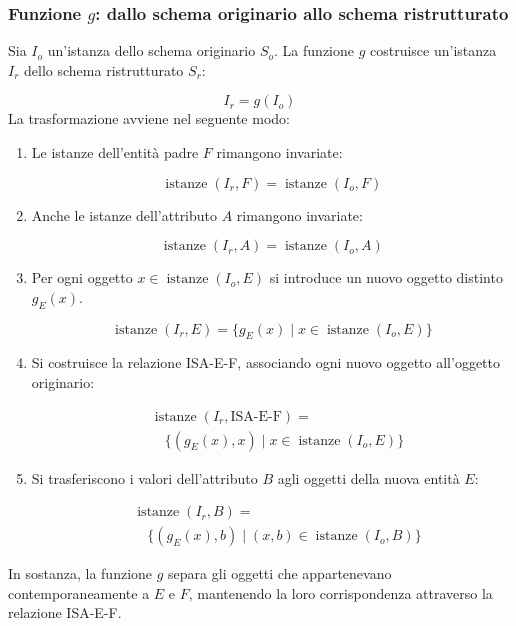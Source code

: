 \subsubsection*{Funzione $g$: dallo schema originario
allo schema ristrutturato}

Sia $I_o$ un'istanza dello schema originario $S_o$.
La funzione $g$ costruisce un'istanza $I_r$ dello
schema ristrutturato $S_r$:

\[
I_r=g(I_o)
\]
La trasformazione avviene nel seguente modo:

\begin{enumerate}
    \item Le istanze dell'entità padre $F$
    rimangono invariate:

    \[
    \operatorname{istanze}(I_r,F)
    =
    \operatorname{istanze}(I_o,F)
    \]

    \item Anche le istanze dell'attributo $A$
    rimangono invariate:

    \[
    \operatorname{istanze}(I_r,A)
    =
    \operatorname{istanze}(I_o,A)
    \]

    \item Per ogni oggetto
    $x\in\operatorname{istanze}(I_o,E)$
    si introduce un nuovo oggetto distinto $g_E(x)$.

    \[
    \operatorname{istanze}(I_r,E)
    =
    \{g_E(x)\mid x\in\operatorname{istanze}(I_o,E)\}
    \]

    \item Si costruisce la relazione ISA-E-F,
    associando ogni nuovo oggetto all'oggetto
    originario:

    \[
    \begin{aligned}
    &\operatorname{istanze}(I_r,\text{ISA-E-F})=\\
    &\quad\{(g_E(x),x)\mid
    x\in\operatorname{istanze}(I_o,E)\}
    \end{aligned}
    \]

    \item Si trasferiscono i valori dell'attributo
    $B$ agli oggetti della nuova entità $E$:

    \[
    \begin{aligned}
    &\operatorname{istanze}(I_r,B)=\\
    &\quad\{(g_E(x),b)\mid
    (x,b)\in\operatorname{istanze}(I_o,B)\}
    \end{aligned}
    \]
\end{enumerate}
\noindent
In sostanza, la funzione $g$ separa gli oggetti
che appartenevano contemporaneamente a $E$ e $F$,
mantenendo la loro corrispondenza attraverso
la relazione ISA-E-F.

